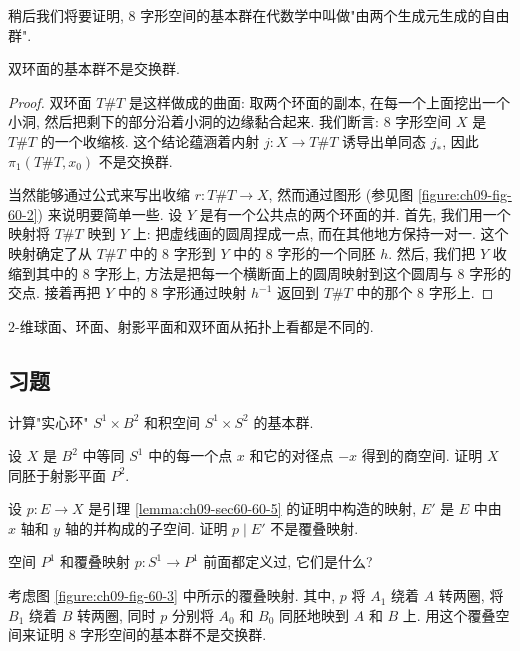 稍后我们将要证明, 8 字形空间的基本群在代数学中叫做"由两个生成元生成的自由群".

\begin{theorem}
\label{theorem:ch09-sec60-60-6}
双环面的基本群不是交换群.
\end{theorem}

\begin{proof}
双环面 $T\# T$ 是这样做成的曲面: 取两个环面的副本, 在每一个上面挖出一个小洞, 然后把剩下的部分沿着小洞的边缘黏合起来. 我们断言: 8 字形空间 $X$ 是 $T\# T$ 的一个收缩核. 这个结论蕴涵着内射 $j\colon X\to T\# T$ 诱导出单同态 $j_*$, 因此 $\pi_1(T\# T,x_0)$ 不是交换群.

当然能够通过公式来写出收缩 $r\colon T\# T\to X$, 然而通过图形 (参见图 \cref{figure:ch09-fig-60-2}) 来说明要简单一些. 设 $Y$ 是有一个公共点的两个环面的并. 首先, 我们用一个映射将 $T\# T$ 映到 $Y$ 上: 把虚线画的圆周捏成一点, 而在其他地方保持一对一. 这个映射确定了从 $T\# T$ 中的 8 字形到 $Y$ 中的 8 字形的一个同胚 $h$. 然后, 我们把 $Y$ 收缩到其中的 8 字形上, 方法是把每一个横断面上的圆周映射到这个圆周与 8 字形的交点. 接着再把 $Y$ 中的 8 字形通过映射 $h^{-1}$ 返回到 $T\# T$ 中的那个 8 字形上.
\end{proof}


\begin{corollary}
\label{corollary:ch09-sec60-60-7}
$2$-维球面、环面、射影平面和双环面从拓扑上看都是不同的.
\end{corollary}

\subsection*{习题}

\begin{exercise}
计算"实心环" $S^{1}\times B^{2}$ 和积空间 $S^{1}\times S^{2}$ 的基本群.
\end{exercise}

\begin{exercise}
设 $X$ 是 $B^{2}$ 中等同 $S^{1}$ 中的每一个点 $x$ 和它的对径点 $-x$ 得到的商空间. 证明 $X$ 同胚于射影平面 $P^{2}$.
\end{exercise}

\begin{exercise}
设 $p\colon E\to X$ 是引理 \cref{lemma:ch09-sec60-60-5} 的证明中构造的映射, $E'$ 是 $E$ 中由 $x$ 轴和 $y$ 轴的并构成的子空间. 证明 $p\mid E'$ 不是覆叠映射.
\end{exercise}

\begin{exercise}
空间 $P^{1}$ 和覆叠映射 $p\colon S^{1}\to P^{1}$ 前面都定义过, 它们是什么?
\end{exercise}

\begin{exercise}
考虑图 \cref{figure:ch09-fig-60-3} 中所示的覆叠映射. 其中, $p$ 将 $A_1$ 绕着 $A$ 转两圈, 将 $B_1$ 绕着 $B$ 转两圈, 同时 $p$ 分别将 $A_0$ 和 $B_0$ 同胚地映到 $A$ 和 $B$ 上. 用这个覆叠空间来证明 8 字形空间的基本群不是交换群.
\end{exercise}